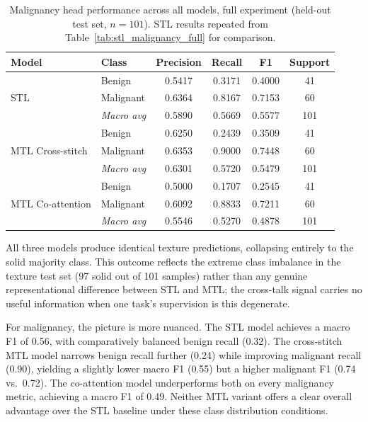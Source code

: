 \begin{table}[h]
\centering
\caption{Malignancy head performance across all models, full experiment (held-out test set, $n=101$). STL results repeated from Table~\ref{tab:stl_malignancy_full} for comparison.}
\label{tab:mtl_malignancy_full}
\begin{tabular}{llcccc}
\hline
\textbf{Model} & \textbf{Class} & \textbf{Precision} & \textbf{Recall}
  & \textbf{F1} & \textbf{Support} \\
\hline
\multirow{3}{*}{STL}
  & Benign       & 0.5417 & 0.3171 & 0.4000 & 41 \\
  & Malignant    & 0.6364 & 0.8167 & 0.7153 & 60 \\
  & \textit{Macro avg} & 0.5890 & 0.5669 & 0.5577 & 101 \\
\hline
\multirow{3}{*}{MTL Cross-stitch}
  & Benign       & 0.6250 & 0.2439 & 0.3509 & 41 \\
  & Malignant    & 0.6353 & 0.9000 & 0.7448 & 60 \\
  & \textit{Macro avg} & 0.6301 & 0.5720 & 0.5479 & 101 \\
\hline
\multirow{3}{*}{MTL Co-attention}
  & Benign       & 0.5000 & 0.1707 & 0.2545 & 41 \\
  & Malignant    & 0.6092 & 0.8833 & 0.7211 & 60 \\
  & \textit{Macro avg} & 0.5546 & 0.5270 & 0.4878 & 101 \\
\hline
\end{tabular}
\end{table}

All three models produce identical texture predictions, collapsing entirely to the solid majority class. This outcome reflects the extreme class imbalance in the texture test set (97 solid out of 101 samples) rather than any genuine representational difference between STL and MTL; the cross-talk signal carries no useful information when one task's supervision is this degenerate.

For malignancy, the picture is more nuanced. The STL model achieves a macro F1 of 0.56, with comparatively balanced benign recall (0.32). The cross-stitch MTL model narrows benign recall further (0.24) while improving malignant recall (0.90), yielding a slightly lower macro F1 (0.55) but a higher malignant F1 (0.74 vs.\ 0.72). The co-attention model underperforms both on every malignancy metric, achieving a macro F1 of 0.49. Neither MTL variant offers a clear overall advantage over the STL baseline under these class distribution conditions.

